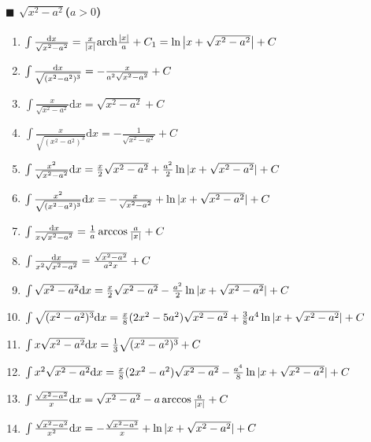 \paragraph{$\blacksquare$ $\sqrt{x^2-a^2}$($a>0$)}

\begin{enumerate}

\item $ \int \frac{\mathrm{d} x}{\sqrt{x^2-a^2}} = \frac{x}{|x|} \mathrm{arch} \frac{|x|}{a} + C_1 = \ln\left|x+\sqrt{x^2-a^2}\right| + C $

\item $ \int \frac{\mathrm{d} x}{\sqrt{(x^2-a^2)^3}} = -\frac{x}{a^2\sqrt{x^2-a^2}} + C$

\item $ \int \frac{x}{\sqrt{x^2-a^2}} \mathrm{d}x = \sqrt{x^2-a^2} + C $

\item $ \int \frac{x}{\sqrt{(x^2-a^2)^3}} \mathrm{d}x = -\frac{1}{\sqrt{x^2-a^2}} + C $

\item $ \int \frac{x^2}{\sqrt{x^2-a^2}} \mathrm{d} x = \frac{x}{2}\sqrt{x^2-a^2} + \frac{a^2}{2}\ln|x+\sqrt{x^2-a^2}| + C $

\item $ \int \frac{x^2}{\sqrt{(x^2-a^2)^3}} \mathrm{d} x = -\frac{x}{\sqrt{x^2-a^2}} + \ln|x+\sqrt{x^2-a^2}| + C $

\item $ \int \frac{\mathrm{d} x}{x\sqrt{x^2-a^2}} = \frac{1}{a} \arccos \frac{a}{|x|} + C $

\item $ \int \frac{\mathrm{d} x}{x^2\sqrt{x^2-a^2}} = \frac{\sqrt{x^2-a^2}}{a^2x} + C $

\item $ \int \sqrt{x^2-a^2} \mathrm{d} x = \frac{x}{2}\sqrt{x^2-a^2} - \frac{a^2}{2}\ln|x + \sqrt{x^2-a^2}| + C $

\item $ \int \sqrt{(x^2-a^2)^3} \mathrm{d} x = \frac{x}{8}(2x^2-5a^2)\sqrt{x^2-a^2} + \frac{3}{8}a^4\ln|x + \sqrt{x^2-a^2}| + C $

\item $ \int x \sqrt{x^2-a^2} \mathrm{d} x = \frac{1}{3} \sqrt{(x^2-a^2)^3} + C $

\item $ \int x^2\sqrt{x^2-a^2} \mathrm{d} x = \frac{x}{8}(2x^2-a^2)\sqrt{x^2-a^2} - \frac{a^4}{8}\ln|x+\sqrt{x^2-a^2}| + C $

\item $ \int \frac{\sqrt{x^2-a^2}}{x} \mathrm{d} x = \sqrt{x^2-a^2} - a \arccos\frac{a}{|x|} + C $

\item $ \int \frac{\sqrt{x^2-a^2}}{x^2} \mathrm{d} x = -\frac{\sqrt{x^2-a^2}}{x} + \ln|x + \sqrt{x^2-a^2}| + C $

\end{enumerate}

